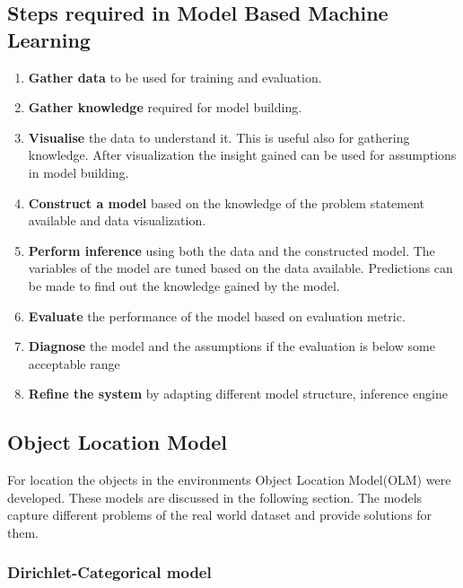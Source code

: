 \documentclass{llncs}
\begin{document}
\subsection*{Steps required in Model Based Machine Learning}
\label{sub:steps}
\begin{enumerate}
	\item \textbf{Gather data} to be used for training and evaluation.
    \item \textbf{Gather knowledge} required for model building.
    \item \textbf{Visualise} the data to understand it. This is useful also for gathering knowledge. After visualization the insight gained can be used for assumptions in model building.
    \item \textbf{Construct a model} based on the knowledge of the problem statement available and data visualization. 
    \item \textbf{Perform inference} using both the data and the constructed model. The variables of the model are tuned based on the data available. Predictions can be made to find out the knowledge gained by the model.
    \item \textbf{Evaluate} the performance of the model based on evaluation metric.
    \item \textbf{Diagnose} the model and the assumptions if the evaluation is below some acceptable range
    \item \textbf{Refine the system} by adapting different model structure, inference engine

\end{enumerate}

\subsection{Object Location Model}

For location the objects in the environments Object Location Model(OLM) were developed. These models are discussed in the following section. The models capture different problems of the real world dataset and provide solutions for them.

\subsubsection{Dirichlet-Categorical model}
\end{document}
